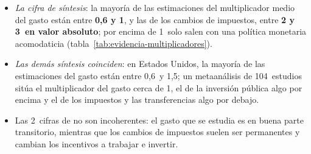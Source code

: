 \documentclass[11pt]{article}
\begin{document}
\begin{itemize}
\item \emph{La cifra de síntesis}\nocite{Ramey2019Ten}: la mayoría de las estimaciones del multiplicador medio del gasto están entre \textbf{0,6 y 1}, y las de los cambios de impuestos, entre \textbf{2 y 3~en valor absoluto}; por encima de 1~solo salen con una política monetaria acomodaticia (tabla~\ref{tab:evidencia-multiplicadores}).
\item \emph{Las demás síntesis coinciden}: en Estados Unidos, la mayoría de las estimaciones del gasto están entre 0,6~y 1,5\nocite{Ramey2016Macroeconomic}; un metaanálisis de 104~estudios sitúa el multiplicador del gasto cerca de 1, el de la inversión pública algo por encima y el de los impuestos y las transferencias algo por debajo\nocite{Gechert2015What}.
\item Las 2~cifras de  no son incoherentes: el gasto que se estudia es en buena parte transitorio, mientras que los cambios de impuestos suelen ser permanentes y cambian los incentivos a trabajar e invertir.
\end{itemize}
\end{document}

